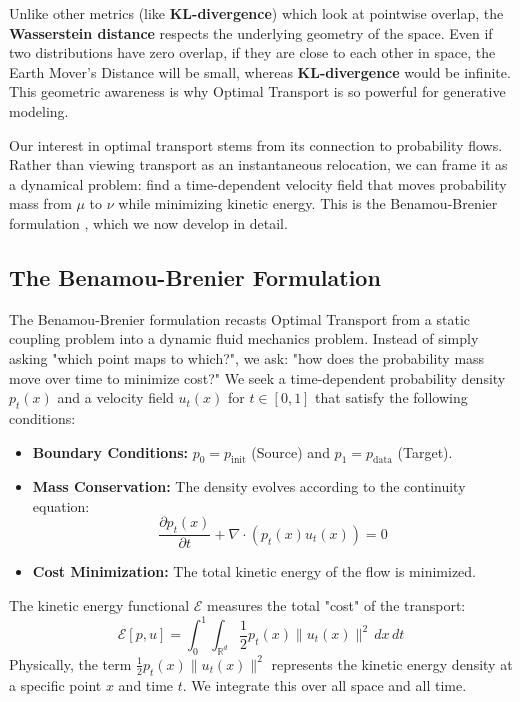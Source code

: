 \documentclass{book}
\begin{document}
Unlike other metrics (like \textbf{KL-divergence}) which look at pointwise overlap, the \textbf{Wasserstein distance} respects the underlying geometry of the space. Even if two distributions have zero overlap, if they are close to each other in space, the Earth Mover's Distance will be small, whereas \textbf{KL-divergence} would be infinite. This geometric awareness is why Optimal Transport is so powerful for generative modeling.

Our interest in optimal transport stems from its connection to probability flows. Rather than viewing transport as an instantaneous relocation, we can frame it as a dynamical problem: find a time-dependent velocity field that moves probability mass from $\mu$ to $\nu$ while minimizing kinetic energy. This is the Benamou-Brenier formulation \cite{benamou2000computational}, which we now develop in detail.

\subsection{The Benamou-Brenier Formulation}

The Benamou-Brenier formulation \cite{benamou2000computational} recasts Optimal Transport from a static coupling problem into a dynamic fluid mechanics problem. Instead of simply asking "which point maps to which?", we ask: "how does the probability mass move over time to minimize cost?" We seek a time-dependent probability density $p_t(x)$ and a velocity field $u_t(x)$ for $t \in [0, 1]$ that satisfy the following conditions:
\begin{itemize}
    \item \textbf{Boundary Conditions:} $p_0 = p_{\text{init}}$ (Source) and $p_1 = p_{\text{data}}$ (Target).
    \item \textbf{Mass Conservation:} The density evolves according to the continuity equation:
    \begin{equation}
    \frac{\partial p_t(x)}{\partial t} + \nabla \cdot (p_t(x) u_t(x)) = 0
    \end{equation}
    \item \textbf{Cost Minimization:} The total kinetic energy of the flow is minimized.
\end{itemize}

The kinetic energy functional $\mathcal{E}$ measures the total "cost" of the transport:
\begin{equation}
\mathcal{E}[p, u] = \int_0^1 \int_{\mathbb{R}^d} \frac{1}{2} p_t(x) \|u_t(x)\|^2 \, dx \, dt
\end{equation}
Physically, the term $\frac{1}{2} p_t(x) \|u_t(x)\|^2$ represents the kinetic energy density at a specific point $x$ and time $t$. We integrate this over all space and all time.
\end{document}
